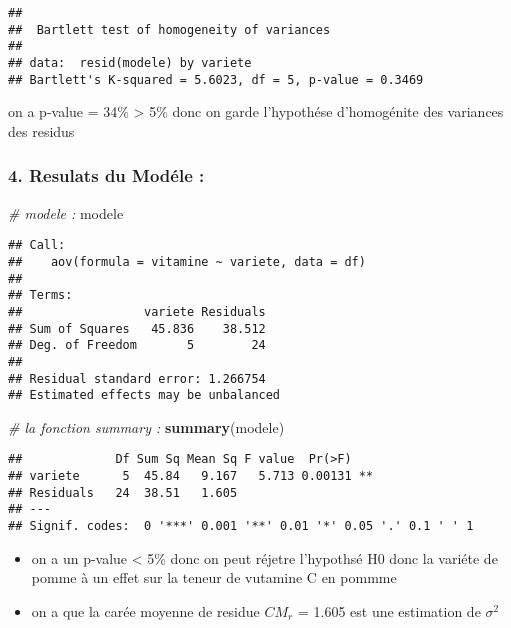 \documentclass[
]{article}
\newenvironment{Shaded}{\begin{snugshade}}{\end{snugshade}}
\newcommand{\CommentTok}[1]{\textcolor[rgb]{0.56,0.35,0.01}{\textit{#1}}}
\newcommand{\FunctionTok}[1]{\textcolor[rgb]{0.13,0.29,0.53}{\textbf{#1}}}
\newcommand{\NormalTok}[1]{#1}
\begin{document}
\begin{verbatim}
## 
##  Bartlett test of homogeneity of variances
## 
## data:  resid(modele) by variete
## Bartlett's K-squared = 5.6023, df = 5, p-value = 0.3469
\end{verbatim}

on a p-value = 34\% \textgreater{} 5\% donc on garde l'hypothése
d'homogénite des variances des residus

\hypertarget{resulats-du-moduxe9le}{%
\subsubsection{4. Resulats du Modéle :}\label{resulats-du-moduxe9le}}

\begin{Shaded}
\begin{Highlighting}[]
\CommentTok{\# modele :}
\NormalTok{modele}
\end{Highlighting}
\end{Shaded}

\begin{verbatim}
## Call:
##    aov(formula = vitamine ~ variete, data = df)
## 
## Terms:
##                 variete Residuals
## Sum of Squares   45.836    38.512
## Deg. of Freedom       5        24
## 
## Residual standard error: 1.266754
## Estimated effects may be unbalanced
\end{verbatim}

\begin{Shaded}
\begin{Highlighting}[]
\CommentTok{\# la fonction summary :}
\FunctionTok{summary}\NormalTok{(modele)}
\end{Highlighting}
\end{Shaded}

\begin{verbatim}
##             Df Sum Sq Mean Sq F value  Pr(>F)   
## variete      5  45.84   9.167   5.713 0.00131 **
## Residuals   24  38.51   1.605                   
## ---
## Signif. codes:  0 '***' 0.001 '**' 0.01 '*' 0.05 '.' 0.1 ' ' 1
\end{verbatim}

\begin{itemize}
\item
  on a un p-value \textless{} 5\% donc on peut réjetre l'hypothsé H0
  donc la variéte de pomme à un effet sur la teneur de vutamine C en
  pommme
\item
  on a que la carée moyenne de residue \(CM_r\) = 1.605 est une
  estimation de \(\sigma^2\)
\end{itemize}
\end{document}
